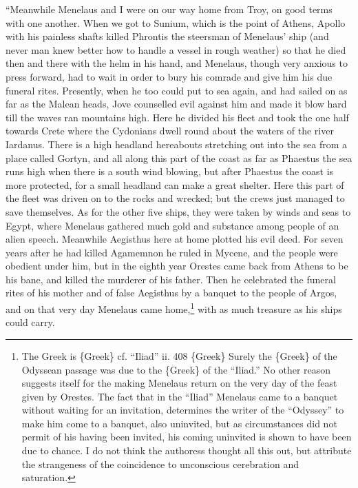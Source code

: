 “Meanwhile Menelaus and I were on our way home from Troy, on good terms with
one another. When we got to Sunium, which is the point of Athens, Apollo with
his painless shafts killed Phrontis the steersman of Menelaus’ ship (and never
man knew better how to handle a vessel in rough weather) so that he died then
and there with the helm in his hand, and Menelaus, though very anxious to press
forward, had to wait in order to bury his comrade and give him his due funeral
rites. Presently, when he too could put to sea again, and had sailed on as far
as the Malean heads, Jove counselled evil against him and made it blow hard
till the waves ran mountains high. Here he divided his fleet and took the one
half towards Crete where the Cydonians dwell round about the waters of the
river Iardanus. There is a high headland hereabouts stretching out into the sea
from a place called Gortyn, and all along this part of the coast as far as
Phaestus the sea runs high when there is a south wind blowing, but after
Phaestus the coast is more protected, for a small headland can make a great
shelter. Here this part of the fleet was driven on to the rocks and wrecked;
but the crews just managed to save themselves. As for the other five ships,
they were taken by winds and seas to Egypt, where Menelaus gathered much gold
and substance among people of an alien speech. Meanwhile Aegisthus here at home
plotted his evil deed. For seven years after he had killed Agamemnon he ruled
in Mycene, and the people were obedient under him, but in the eighth year
Orestes came back from Athens to be his bane, and killed the murderer of his
father. Then he celebrated the funeral rites of his mother and of false
Aegisthus by a banquet to the people of Argos, and on that very day Menelaus
came home,\footnote{The Greek is \{Greek\} cf. “Iliad” ii. 408 \{Greek\} Surely the \{Greek\} of the
Odyssean passage was due to the \{Greek\} of the “Iliad.” No other reason
suggests itself for the making Menelaus return on the very day of the feast
given by Orestes. The fact that in the “Iliad” Menelaus came to a banquet
without waiting for an invitation, determines the writer of the “Odyssey” to
make him come to a banquet, also uninvited, but as circumstances did not
permit of his having been invited, his coming uninvited is shown to have been
due to chance. I do not think the authoress thought all this out, but
attribute the strangeness of the coincidence to unconscious cerebration and
saturation.} with
as much treasure as his ships could carry.

